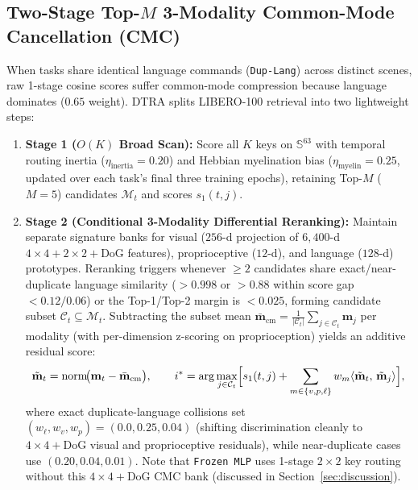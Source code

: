 \documentclass[10pt]{article}
\begin{document}
\subsection{Two-Stage Top-\texorpdfstring{$M$}{M} 3-Modality Common-Mode Cancellation (CMC)}
When tasks share identical language commands (\texttt{Dup-Lang}) across distinct scenes, raw 1-stage cosine scores suffer common-mode compression because language dominates ($0.65$ weight). DTRA splits LIBERO-100 retrieval into two lightweight steps:
\begin{enumerate}[leftmargin=*,itemsep=1.5pt]
  \item \textbf{Stage 1 ($O(K)$ Broad Scan):} Score all $K$ keys on $\mathbb{S}^{63}$ with temporal routing inertia ($\eta_{\text{inertia}}=0.20$) and Hebbian myelination bias ($\eta_{\text{myelin}}=0.25$, updated over each task's final three training epochs), retaining Top-$M$ ($M=5$) candidates $\mathcal{M}_t$ and scores $s_1(t, j)$.
  \item \textbf{Stage 2 (Conditional 3-Modality Differential Reranking):} Maintain separate signature banks for visual ($256$-d projection of $6{,}400$-d $4\times 4+2\times 2+\text{DoG}$ features), proprioceptive ($12$-d), and language ($128$-d) prototypes. Reranking triggers whenever $\ge 2$ candidates share exact/near-duplicate language similarity ($>0.998$ or $>0.88$ within score gap $<0.12/0.06$) or the Top-1/Top-2 margin is $<0.025$, forming candidate subset $\mathcal{C}_t \subseteq \mathcal{M}_t$. Subtracting the subset mean $\bar{\mathbf{m}}_{\text{cm}} = \frac{1}{|\mathcal{C}_t|}\sum_{j \in \mathcal{C}_t} \mathbf{m}_j$ per modality (with per-dimension z-scoring on proprioception) yields an additive residual score:
  \begin{equation}
    \tilde{\mathbf{m}}_t = \mathrm{norm}\!\bigl(\mathbf{m}_t - \bar{\mathbf{m}}_{\text{cm}}\bigr), \qquad
    i^* = \arg\max_{j \in \mathcal{C}_t} \Bigl[ s_1(t, j) + \sum_{m \in \{v,p,\ell\}} w_m \langle \tilde{\mathbf{m}}_t,\, \tilde{\mathbf{m}}_j \rangle \Bigr],
  \end{equation}
  where exact duplicate-language collisions set $(w_\ell, w_v, w_p) = (0.0, 0.25, 0.04)$ (shifting discrimination cleanly to $4\times 4+\text{DoG}$ visual and proprioceptive residuals), while near-duplicate cases use $(0.20, 0.04, 0.01)$. Note that \texttt{Frozen MLP} uses 1-stage $2\times 2$ key routing without this $4\times 4+\text{DoG}$ CMC bank (discussed in Section~\ref{sec:discussion}).
\end{enumerate}
\end{document}
